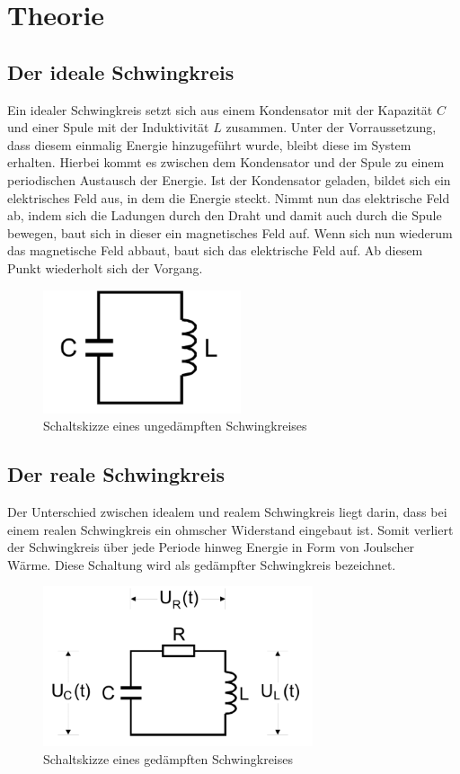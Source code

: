 \section{Theorie}
\label{sec:Theorie}

\subsection{Der ideale Schwingkreis}

Ein idealer Schwingkreis setzt sich aus einem Kondensator mit der Kapazität $C$ und einer 
Spule mit der Induktivität $L$ zusammen. Unter der Vorraussetzung, dass diesem einmalig Energie
hinzugeführt wurde, bleibt diese im System erhalten. Hierbei kommt es zwischen dem Kondensator 
und der Spule zu einem periodischen Austausch der Energie. 
Ist der Kondensator geladen, bildet sich ein elektrisches Feld aus, in dem die Energie 
steckt. Nimmt nun das elektrische Feld ab, indem sich die Ladungen durch den Draht 
und damit auch durch die Spule bewegen, baut sich in dieser ein magnetisches Feld auf. Wenn sich
nun wiederum das magnetische Feld abbaut, baut sich das elektrische Feld auf. Ab diesem Punkt
wiederholt sich der Vorgang.

\begin{figure}[H]
  \centering
  \includegraphics{content/UngedaempfterSchwingkreis.png}
  \caption{Schaltskizze eines ungedämpften Schwingkreises}
  \label{fig:ugsk}
\end{figure}



\subsection{Der reale Schwingkreis}

Der Unterschied zwischen idealem und realem Schwingkreis liegt darin, dass bei einem realen 
Schwingkreis ein ohmscher Widerstand eingebaut ist. Somit verliert der Schwingkreis über jede 
Periode hinweg Energie in Form von Joulscher Wärme. Diese Schaltung wird als gedämpfter 
Schwingkreis bezeichnet.

\begin{figure}[H]
  \centering
  \includegraphics{content/GedaempfterSchwingkreis.png}
  \caption{Schaltskizze eines gedämpften Schwingkreises}
  \label{fig:gsk}
\end{figure}

